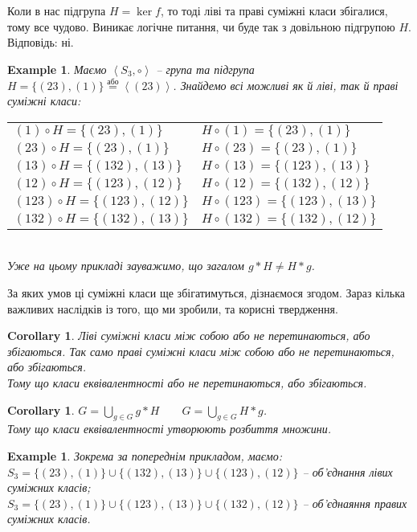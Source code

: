 \documentclass[a4paper, 10pt]{article}
\theoremstyle{theoremdd}
\theoremstyle{theoremdd}
\theoremstyle{theoremdd}
\theoremstyle{theoremdd}
\theoremstyle{theoremdd}
\newtheorem{example}[theorem]{Example}
\theoremstyle{theoremdd}
\theoremstyle{theoremdd}
\theoremstyle{theoremdd}
\theoremstyle{theoremdd}
\theoremstyle{theoremdd}
\theoremstyle{theoremdd}
\theoremstyle{theoremdd}
\theoremstyle{theoremdd}
\theoremstyle{theoremdd}
\newtheorem{corollary}[theorem]{Corollary}
\theoremstyle{theoremdd}
\begin{document}
Коли в нас підгрупа $H = \ker f$, то тоді ліві та праві суміжні класи збігалися, тому все чудово. Виникає логічне питання, чи буде так з довільною підгрупою $H$. Відповідь: ні.

\begin{example}
Маємо $\left<S_3, \circ \right>$ -- група та підгрупа $H = \{ (23), (1) \} \overset{\text{або}}{=} \left<(23)\right>$. Знайдемо всі можливі як й ліві, так й праві суміжні класи:\\
\begin{tabular}{ll}
$(1) \circ H = \{(23),(1)\}$ & $H \circ (1) = \{(23),(1)\}$\\
$(23) \circ H = \{(23),(1)\}$ & $H \circ (23) = \{(23),(1)\}$\\
$(13) \circ H = \{(132),(13)\}$ & $H \circ (13)  = \{(123),(13)\}$\\
$(12) \circ H = \{(123),(12)\}$ & $H \circ (12)  = \{(132),(12)\}$\\
$(123) \circ H = \{(123),(12)\}$ & $H \circ (123) = \{(123),(13)\}$\\
$(132) \circ H = \{(132),(13)\}$ & $H \circ (132) = \{(132),(12)\}$\\
\end{tabular}\\
Уже на цьому прикладі зауважимо, що загалом $g * H \neq H* g$.
\end{example}

За яких умов ці суміжні класи ще збігатимуться, дізнаємося згодом. Зараз кілька важливих наслідків із того, що ми зробили, та корисні твердження.

\begin{corollary}
Ліві суміжні класи між собою або не перетинаються, або збігаються. Так само праві суміжні класи між собою або не перетинаються, або збігаються.\\
\textit{Тому що класи еквівалентності або не перетинаються, або збігаються.}
\end{corollary}

\begin{corollary}
$G = \displaystyle\bigcup_{g \in G} g*H \qquad G = \displaystyle\bigcup_{g \in G} H*g$.\\
\textit{Тому що класи еквівалентності утворюють розбиття множини.}
\end{corollary}

\begin{example}
Зокрема за попереднім прикладом, маємо:\\
$S_3 = \{(23), (1)\} \cup \{(132), (13)\} \cup \{(123), (12)\}$ -- об'єднання лівих суміжних класів;\\
$S_3 = \{(23), (1)\} \cup \{(123), (13)\} \cup \{(132), (12)\}$ -- об'єднаяння правих суміжних класів.
\iffalse
\\
$\mathbb{Z} = (0 + n\mathbb{Z}) \cup (1 + n\mathbb{Z}) \cup \dots \cup ((n-1) + n\mathbb{Z})$
\fi
\end{example}
\end{document}
